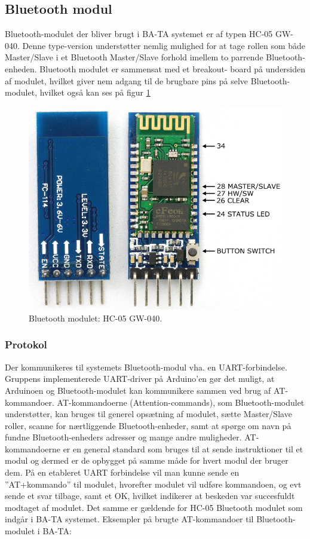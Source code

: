 \subsection{Bluetooth modul}

Bluetooth-modulet der bliver brugt i BA-TA systemet er af typen HC-05 GW-040. Denne type-version understøtter nemlig mulighed for at tage rollen som både Master/Slave i et Bluetooth Master/Slave forhold imellem to parrende Bluetooth-enheden. Bluetooth modulet er sammensat med et breakout- board på undersiden af modulet, hvilket giver nem adgang til de brugbare pins på selve Bluetooth-modulet, hvilket også kan ses på figur \ref{fig:bluetooth_modul}

\begin{figure}[H]
	\centering
	\includegraphics[width = 200 pt]{Img/modul.PNG}
	\caption{Bluetooth modulet: HC-05 GW-040.}
	\label{fig:bluetooth_modul}
\end{figure}

\subsubsection{Protokol}
Der kommunikeres til systemets Bluetooth-modul vha. en UART-forbindelse. Gruppens implementerede UART-driver på Arduino’en gør det muligt, at Arduinoen og Bluetooth-modulet kan kommunikere sammen ved brug af AT-kommandoer. 
AT-kommandoerne (Attention-commands), som Bluetooth-modulet understøtter, kan bruges til generel opsætning af modulet, sætte Master/Slave roller, scanne for nærtliggende Bluetooth-enheder, samt at spørge om navn på fundne Bluetooth-enheders adresser og mange andre muligheder. AT-kommandoerne er en general standard som bruges til at sende instruktioner til et modul og dermed er de opbygget på samme måde for hvert modul der bruger dem. På en etableret UART forbindelse vil man kunne sende en ”AT+kommando” til modulet, hvorefter modulet vil udføre kommandoen, og evt sende et svar tilbage, samt et OK, hvilket indikerer at beskeden var succesfuldt modtaget af modulet. Det samme er gældende for HC-05 Bluetooth modulet som indgår i BA-TA systemet.
Eksempler på brugte AT-kommandoer til Bluetooth-modulet i BA-TA:

